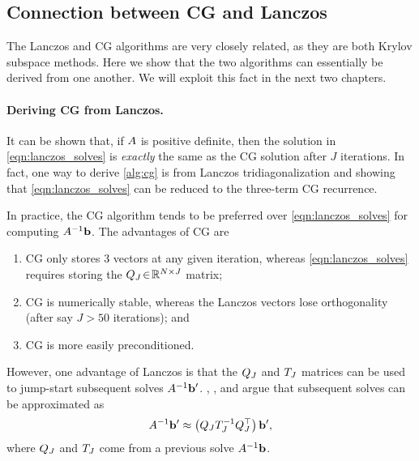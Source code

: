 \subsection{Connection between CG and Lanczos}
\label{sec:cg_lanczos_connection}

The Lanczos and CG algorithms are very closely related, as they are both Krylov subspace methods.
Here we show that the two algorithms can essentially be derived from one another.
We will exploit this fact in the next two chapters.

\paragraph{Deriving CG from Lanczos.}
It can be shown that, if $A$ is positive definite, then the solution in \cref{eqn:lanczos_solves} is \emph{exactly} the same as the CG solution after $J$ iterations.
In fact, one way to derive \cref{alg:cg} is from Lanczos tridiagonalization and showing that \cref{eqn:lanczos_solves} can be reduced to the three-term CG recurrence.

In practice, the CG algorithm tends to be preferred over \cref{eqn:lanczos_solves} for computing $A^{-1} \mathbf{b}$.
The advantages of CG are
\begin{enumerate}
  \item CG only stores 3 vectors at any given iteration, whereas \cref{eqn:lanczos_solves} requires storing the $Q_J \! \in \! \mathbb{R}^{N \times J}$ matrix;
  \item CG is numerically stable, whereas the Lanczos vectors lose orthogonality (after say $J > 50$ iterations); and
  \item CG is more easily preconditioned.
\end{enumerate}
However, one advantage of Lanczos is that the $Q_J$ and $T_J$ matrices can be used to jump-start subsequent solves $A^{-1} \mathbf{b}'$.
\citet{parlett1980new}, \citet{saad1987lanczos}, and \citet{schneider2001krylov} argue that subsequent solves can be approximated as
%
\begin{equation}
  A^{-1} \mathbf{b}' \approx \left( Q_J T_J^{-1} Q_J^\top \right) \mathbf{b}',
  \label{eq:lanczos_solve}
\end{equation}
%
where $Q_J$ and $T_J$ come from a previous solve $A^{-1} \mathbf{b}$.

